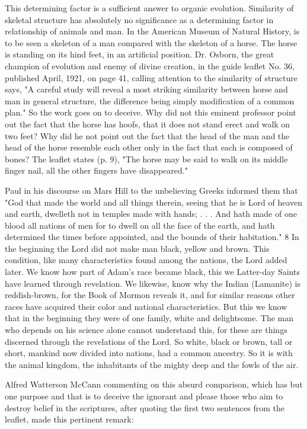 This determining factor is a sufficient answer to organic evolution. Similarity of skeletal
structure has absolutely no significance as a determining factor in relationship of animals and
man. In the American Museum of Natural History, is to be seen a skeleton of a man
compared with the skeleton of a horse. The horse is standing on its hind feet, in an artificial
position. Dr. Osborn, the great champion of evolution and enemy of divine creation, in the
guide leaflet No. 36, published April, 1921, on page 41, calling attention to the similarity of
structure says, "A careful study will reveal a most striking similarity between horse and man
in general structure, the difference being simply modification of a common plan." So the
work goes on to deceive. Why did not this eminent professor point out the fact that the horse
has hoofs, that it does not stand erect and walk on two feet? Why did he not point out the fact
that the head of the man and the head of the horse resemble each other only in the fact that
each is composed of bones? The leaflet states (p. 9), "The horse may be said to walk on its
middle finger nail, all the other fingers have disappeared."

Paul in his discourse on Mars Hill to the unbelieving Greeks informed them that "God that
made the world and all things therein, seeing that he is Lord of heaven and earth, dwelleth
not in temples made with hands; . . . And hath made of one blood all nations of men for to
dwell on all the face of the earth, and hath determined the times before appointed, and the
bounds of their habitation." 8 In the beginning the Lord did not make man black, yellow and
brown. This condition, like many characteristics found among the nations, the Lord added
later. We know how part of Adam's race became black, this we Latter-day Saints have
learned through revelation. We likewise, know why the Indian (Lamanite) is reddish-brown,
for the Book of Mormon reveals it, and for similar reasons other races have acquired their
color and national characteristics. But this we know that in the beginning they were of one
family, white and delightsome. The man who depends on his science alone cannot
understand this, for these are things discerned through the revelations of the Lord. So white,
black or brown, tall or short, mankind now divided into nations, had a common ancestry. So
it is with the animal kingdom, the inhabitants of the mighty deep and the fowls of the air.

Alfred Watterson McCann commenting on this absurd comparison, which has but one
purpose and that is to deceive the ignorant and please those who aim to destroy belief in the
scriptures, after quoting the first two sentences from the leaflet, made this pertinent remark:


